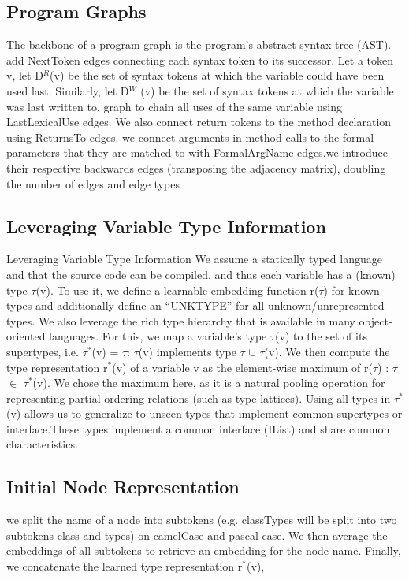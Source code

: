 \documentclass{article}
\begin{document}
\subsection{Program Graphs}
The backbone of a program graph is the program’s abstract syntax tree (AST). add NextToken edges connecting each syntax token to its successor. Let a token v, let D$^R$(v) be the set of syntax tokens at which the variable could have been used last. Similarly, let D$^W$ (v) be the set of syntax tokens at which the variable was last written to. graph to chain all uses of the same variable using LastLexicalUse edges. We also connect return tokens to the method declaration using ReturnsTo edges. we connect arguments in method calls to the formal parameters that they are matched to with FormalArgName edges.we introduce their respective backwards edges (transposing the adjacency matrix), doubling the number of edges and edge types

\subsection{Leveraging Variable Type Information}
Leveraging Variable Type Information We assume a statically typed language and that the source code can be compiled, and thus each variable has a (known) type $\tau$(v). To use it, we define a learnable embedding function r($\tau$) for known types and additionally define an “UNKTYPE” for all unknown/unrepresented types. We also leverage the rich type hierarchy that is available in many object-oriented languages. For this, we map a variable’s type $\tau$(v) to the set of its supertypes, i.e. $\tau^\ast$(v) = {$\tau$: $\tau$(v) implements type $\tau$} $\cup$ {$\tau$(v)}. We then compute the type representation r$^\ast$(v) of a variable v as the element-wise maximum of {r($\tau$) : $\tau$ $\in$ $\tau^\ast$(v)}. We chose the maximum here, as it is a natural pooling operation for representing partial ordering relations (such as type lattices). Using all types in $\tau^\ast$(v) allows us to generalize to unseen types that implement common supertypes or interface.These types implement a common interface (IList) and share common characteristics.

\subsection{Initial Node Representation}
we split the name of a node into subtokens (e.g. classTypes will be split into two subtokens class and types) on camelCase and pascal case. We then average the embeddings of all subtokens to retrieve an embedding for the node name. Finally, we concatenate the learned type representation r$^{\ast}$(v),
\end{document}
